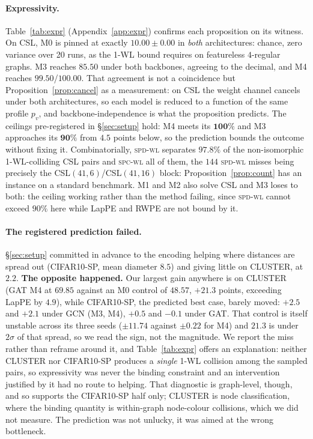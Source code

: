 \documentclass[11pt]{article}
\newcommand{\SPD}{\textsc{spd-wl}}
\newcommand{\SPC}{\textsc{spc-wl}}
\begin{document}
\paragraph{Expressivity.}
Table~\ref{tab:expr} (Appendix~\ref{app:expr}) confirms each proposition on its witness. On CSL,
M0 is pinned at exactly $10.00\pm0.00$ in \emph{both} architectures: chance, zero variance
over 20 runs, as the 1-WL bound requires on featureless $4$-regular graphs. M3 reaches $85.50$
under both backbones, agreeing to the decimal, and M4 reaches $99.50$/$100.00$. That agreement
is not a coincidence but Proposition~\ref{prop:cancel} as a measurement: on CSL the weight
channel cancels under both architectures, so each model is reduced to a function of the same
profile $p_v$, and backbone-independence is what the proposition predicts. The ceilings pre-registered in
\S\ref{sec:setup} hold: M4 meets its $\mathbf{100\%}$ and M3 approaches its $\mathbf{90\%}$ from
$4.5$ points below, so the prediction bounds the outcome without fixing it. Combinatorially, \SPD{} separates $97.8\%$ of the non-isomorphic
1-WL-colliding CSL pairs and \SPC{} all of them, the $144$ \SPD{} misses being precisely the
CSL$(41,6)$/CSL$(41,16)$ block: Proposition~\ref{prop:count} has an instance on a standard
benchmark. M1 and M2 also solve CSL and M3 loses to both: the ceiling working rather than the
method failing, since \SPD{} cannot exceed $90\%$ here while LapPE and RWPE are not bound by
it.

\paragraph{The registered prediction failed.}
\S\ref{sec:setup} committed in advance to the encoding helping where distances are spread out
(CIFAR10-SP, mean diameter $8.5$) and giving little on CLUSTER, at $2.2$. \textbf{The opposite
happened.} Our largest gain anywhere is on CLUSTER (GAT M4 at $69.85$ against an M0 control
of $48.57$, $+21.3$ points, exceeding LapPE by $4.9$), while CIFAR10-SP, the predicted best
case, barely moved: $+2.5$ and $+2.1$ under GCN (M3, M4), $+0.5$ and $-0.1$ under GAT. That
control is itself unstable across its three seeds ($\pm11.74$ against $\pm0.22$ for M4) and
$21.3$ is under $2\sigma$ of that spread, so we read the sign, not the magnitude. We report the miss rather than
reframe around it, and Table~\ref{tab:expr} offers an explanation:
neither CLUSTER nor CIFAR10-SP produces a \emph{single} 1-WL collision among the sampled pairs,
so expressivity was never the binding constraint and an intervention justified by it had no
route to helping. That diagnostic is graph-level, though, and so supports the CIFAR10-SP half
only; CLUSTER is node classification, where the binding quantity is within-graph node-colour
collisions, which we did not measure. The prediction was not unlucky, it was aimed at the wrong
bottleneck.
\end{document}

